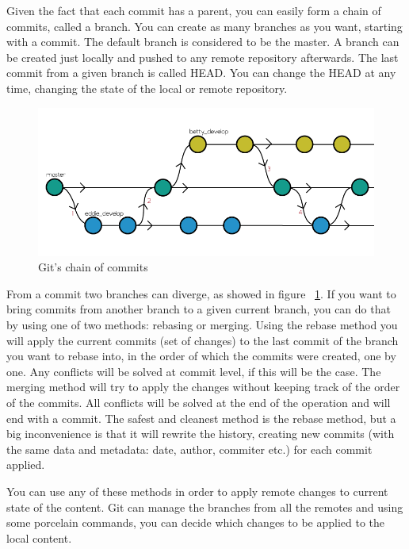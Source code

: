         Given the fact that each commit has a parent, you can easily form a chain of commits, called a branch. You can create as many branches as you want, starting with a commit. The default branch is considered to be the master. A branch can be created just locally and pushed to any remote repository afterwards. The last commit from a given branch is called HEAD.
        You can change the HEAD at any time, changing the state of the local or remote repository.

        \begin{figure}[h]
           \begin{center}
               \includegraphics[width=\textwidth]{theoretical/git_flow.png}
            \end{center}
            \caption{Git's chain of commits \cite{Commits}}
            \label{fig:flow}
        \end{figure}

        From a commit two branches can diverge, as showed in figure ~\ref{fig:flow}. If you want to bring commits from another branch to a given current branch, you can do that by using one of two methods: rebasing or merging.
        Using the rebase method you will apply the current commits (set of changes) to the last commit of the branch you want to rebase into, in the order of which the commits were created, one by one. Any conflicts will be solved at commit level, if this will be the case.
        The merging method will try to apply the changes without keeping track of the order of the commits. All conflicts will be solved at the end of the operation and will end with a commit.
        The safest and cleanest method is the rebase method, but a big inconvenience is that it will rewrite the history, creating new commits (with the same data and metadata: date, author, commiter etc.) for each commit applied.

        You can use any of these methods in order to apply remote changes to current state of the content. Git can manage the branches from all the remotes and using some porcelain commands, you can decide which changes to be applied to the local content.

